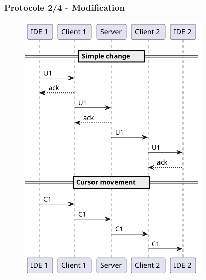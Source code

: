 \documentclass{beamer}
\begin{document}
\begin{frame}
    \frametitle{Protocole 2/4 - Modification}
    \begin{figure}
        \includegraphics[width=\textwidth,height=0.8\textheight,keepaspectratio]{diagrams/2.png}
    \end{figure}
\end{frame}
\end{document}
